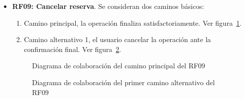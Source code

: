 \begin{itemize}
	\FloatBarrier
	\item \textbf{RF09: Cancelar reserva}. Se consideran dos caminos básicos: 
	\begin{enumerate}
		\item Camino principal, la operación finaliza satisfactoriamente. Ver figura~\ref{fig:diagramaColaboracion_RF09_1}.
		\item Camino alternativo 1, el usuario cancelar la operación ante la confirmación final. Ver figura~\ref{fig:diagramaColaboracion_RF09_2}.
	\end{enumerate}
	\begin{figure} [!htb]
		\centering
		\caption{Diagrama de colaboración del camino principal del RF09}
		\label{fig:diagramaColaboracion_RF09_1}
	\end{figure}
	\begin{figure} [!htb]
		\centering
		\caption{Diagrama de colaboración del primer camino alternativo del RF09}
		\label{fig:diagramaColaboracion_RF09_2}
	\end{figure}
	

\end{itemize}
